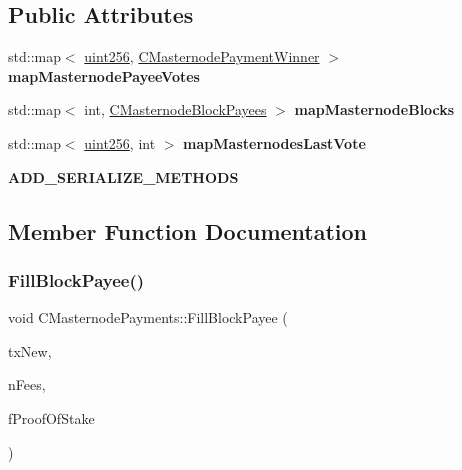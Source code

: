 \subsection*{Public Attributes}
\begin{DoxyCompactItemize}
\item 
\mbox{\label{class_c_masternode_payments_ab88cc3dc744299f7ac159ec44d9225ef}} 
std\+::map$<$ \mbox{\hyperlink{classuint256}{uint256}}, \mbox{\hyperlink{class_c_masternode_payment_winner}{C\+Masternode\+Payment\+Winner}} $>$ {\bfseries map\+Masternode\+Payee\+Votes}
\item 
\mbox{\label{class_c_masternode_payments_a6feb2c94183cd649ede84dc38d3ae442}} 
std\+::map$<$ int, \mbox{\hyperlink{class_c_masternode_block_payees}{C\+Masternode\+Block\+Payees}} $>$ {\bfseries map\+Masternode\+Blocks}
\item 
\mbox{\label{class_c_masternode_payments_a189376c929b638e6ba7dbf6a0b34b545}} 
std\+::map$<$ \mbox{\hyperlink{classuint256}{uint256}}, int $>$ {\bfseries map\+Masternodes\+Last\+Vote}
\item 
\mbox{\label{class_c_masternode_payments_a0f90877d276308aa16314dcaa84f332c}} 
{\bfseries A\+D\+D\+\_\+\+S\+E\+R\+I\+A\+L\+I\+Z\+E\+\_\+\+M\+E\+T\+H\+O\+DS}
\end{DoxyCompactItemize}


\subsection{Member Function Documentation}
\mbox{\label{class_c_masternode_payments_a459bf2e3a7e56743663026fd8f6d768d}} 
\subsubsection{\texorpdfstring{Fill\+Block\+Payee()}{FillBlockPayee()}}
{\footnotesize\ttfamily void C\+Masternode\+Payments\+::\+Fill\+Block\+Payee (\begin{DoxyParamCaption}\item[{\mbox{\hyperlink{struct_c_mutable_transaction}{C\+Mutable\+Transaction}} \&}]{tx\+New,  }\item[{int64\+\_\+t}]{n\+Fees,  }\item[{bool}]{f\+Proof\+Of\+Stake }\end{DoxyParamCaption})}

